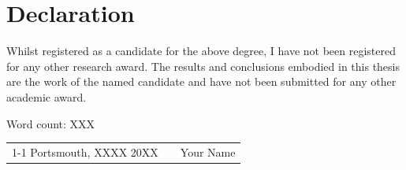 \chapter*{Declaration}

Whilst registered as a candidate for the above degree, I have not been registered for any other research award. The results and conclusions embodied in this thesis are the work of the named candidate and have not been submitted for any other academic award.

Word count: XXX
\vspace{1cm}

\begin{tabular}{lp{3em}l}
 \hspace{4cm}   && \hspace{4cm} \\\cline{1-1}\cline{3-3}
 Portsmouth, XXXX 20XX && Your Name\end{tabular}
